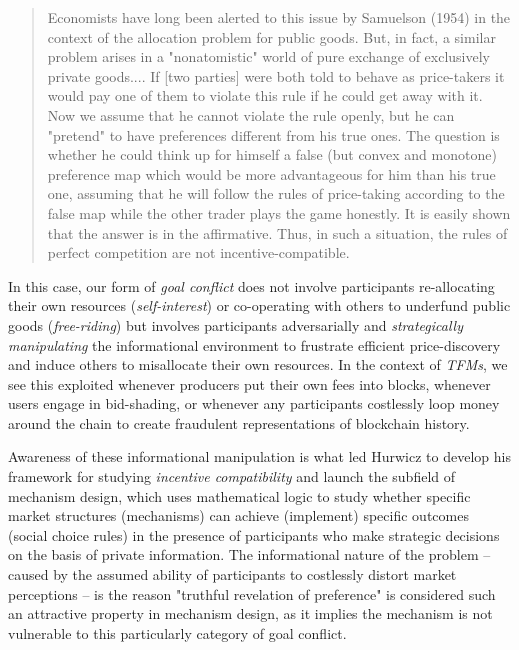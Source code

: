 \begin{quote}
Economists have long been alerted to this issue by Samuelson (1954) in the context of the allocation problem for public goods. But, in fact, a similar problem arises in a "nonatomistic" world of pure exchange of exclusively private goods.... If [two parties] were both told to behave as price-takers it would pay one of them to violate this rule if he could get away with it. Now we assume that he cannot violate the rule openly, but he can "pretend" to have preferences different from his true ones. The question is whether he could think up for himself a false (but convex and monotone) preference map which would be more advantageous for him than his true one, assuming that he will follow the rules of price-taking according to the false map while the other trader plays the game honestly. It is easily shown that the answer is in the affirmative. Thus, in such a situation, the rules of perfect competition are not incentive-compatible.
\end{quote}

In this case, our form of \textit{goal conflict} does not involve participants re-allocating their own resources (\textit{self-interest}) or co-operating with others to underfund public goods (\textit{free-riding}) but involves participants adversarially and \textit{strategically manipulating} the informational environment to frustrate efficient price-discovery and induce others to misallocate their own resources. In the context of \textit{TFMs}, we see this exploited whenever producers put their own fees into blocks, whenever users engage in bid-shading, or whenever any participants costlessly loop money around the chain to create fraudulent representations of blockchain history.

Awareness of these informational manipulation is what led Hurwicz to develop his framework for studying \textit{incentive compatibility} and launch the subfield of mechanism design, which uses mathematical logic to study whether specific market structures (mechanisms) can achieve (implement) specific outcomes (social choice rules) in the presence of participants who make strategic decisions on the basis of private information. The informational nature of the problem -- caused by the assumed ability of participants to costlessly distort market perceptions -- is the reason "truthful revelation of preference" is considered such an attractive property in mechanism design, as it implies the mechanism is not vulnerable to this particularly category of goal conflict.

